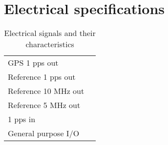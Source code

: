 
\section{Electrical specifications}
\label{s:electricalspecs}

\begin{table}
\begin{tabular}{ll}
GPS 1 pps out & \\
Reference 1 pps out & \\
Reference 10 MHz out & \\
Reference 5 MHz out & \\
1 pps in & \\
General purpose I/O & \\
\end{tabular}
\caption{Electrical signals and their characteristics}
\end{table}